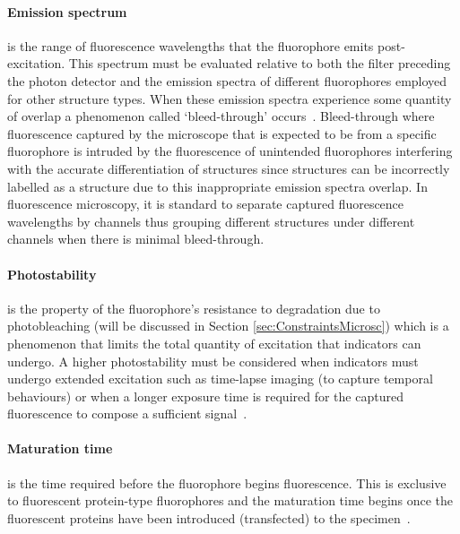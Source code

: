 \paragraph{Emission spectrum} is the range of fluorescence wavelengths that the fluorophore emits post-excitation. This spectrum must be evaluated relative to both the filter preceding the photon detector and the emission spectra of different fluorophores employed for other structure types. When these emission spectra experience some quantity of overlap a phenomenon called `bleed-through' occurs~\cite{Bolte-2006}. Bleed-through where fluorescence captured by the microscope that is expected to be from a specific fluorophore is intruded by the fluorescence of unintended fluorophores interfering with the accurate differentiation of structures since structures can be incorrectly labelled as a structure due to this inappropriate emission spectra overlap. In fluorescence microscopy, it is standard to separate captured fluorescence wavelengths by channels thus grouping different structures under different channels when there is minimal bleed-through.
\paragraph{Photostability} is the property of the fluorophore's resistance to degradation due to photobleaching (will be discussed in Section \ref{sec:ConstraintsMicrosc}) which is a phenomenon that limits the total quantity of excitation that indicators can undergo. A higher photostability must be considered when indicators must undergo extended excitation such as time-lapse imaging (to capture temporal behaviours) or when a longer exposure time is required for the captured fluorescence to compose a sufficient signal~\cite{fluorophore_article}.
\paragraph{Maturation time} is the time required before the fluorophore begins fluorescence. This is exclusive to fluorescent protein-type fluorophores and the maturation time begins once the fluorescent proteins have been introduced (transfected) to the specimen~\cite[p.286-289]{matureFluoro}.
